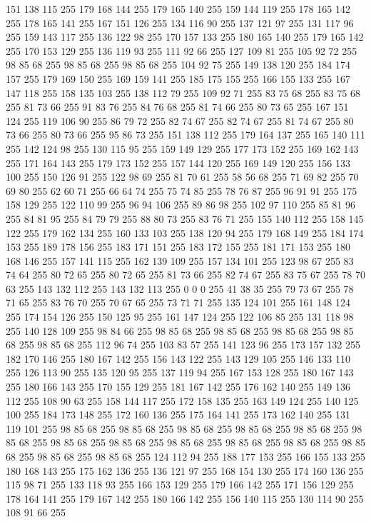151 138 115 255 179 168 144 255 179 165 140 255 159 144 119 255 178 165 142 255 178 165 141 255 167 151 126 255 134 116 90 255 137 121 97 255 131 117 96 255 159 143 117 255 136 122 98 255 170 157 133 255 180 165 140 255 179 165 142 255 170 153 129 255 136 119 93 255 111 92 66 255 127 109 81 255 105 92 72 255 98 85 68 255 98 85 68 255 98 85 68 255 104 92 75 255 149 138 120 255 184 174 157 255 179 169 150 255 169 159 141 255 185 175 155 255 166 155 133 255 167 147 118 255 158 135 103 255 138 112 79 255 109 92 71 255 83 75 68 255 83 75 68 255 81 73 66 255 91 83 76 255 84 76 68 255 81 74 66 255 80 73 65 255 167 151 124 255 119 106 90 255 86 79 72 255 82 74 67 255 82 74 67 255 81 74 67 255 80 73 66 255 80 73 66 255 95 86 73 255 151 138 112 255 179 164 137 255 165 140 111 255 142 124 98 255 130 115 95 255 159 149 129 255 177 173 152 255 169 162 143 255 171 164 143 255 179 173 152 255 157 144 120 255 169 149 120 255 156 133 100 255 150 126 91 255
122 98 69 255 81 70 61 255 58 56 68 255 71 69 82 255 70 69 80 255 62 60 71 255 66 64 74 255 75 74 85 255 78 76 87 255 96 91 91 255 175 158 129 255 122 110 99 255 96 94 106 255 89 86 98 255 102 97 110 255 85 81 96 255 84 81 95 255 84 79 79 255 88 80 73 255 83 76 71 255 155 140 112 255 158 145 122 255 179 162 134 255 160 133 103 255 138 120 94 255 179 168 149 255 184 174 153 255 189 178 156 255 183 171 151 255 183 172 155 255 181 171 153 255 180 168 146 255 157 141 115 255 162 139 109 255 157 134 101 255 123 98 67 255 83 74 64 255 80 72 65 255 80 72 65 255 81 73 66 255 82 74 67 255 83 75 67 255 78 70 63 255 143 132 112 255 143 132 113 255 0 0 0 255 41 38 35 255 79 73 67 255 78 71 65 255 83 76 70 255 70 67 65 255 73 71 71 255 135 124 101 255 161 148 124 255 174 154 126 255 150 125 95 255 161 147 124 255 122 106 85 255 131 118 98 255 140 128 109 255 98 84 66 255 98 85 68 255 98 85 68 255 98 85 68 255
98 85 68 255 98 85 68 255 112 96 74 255 103 83 57 255 141 123 96 255 173 157 132 255 182 170 146 255 180 167 142 255 156 143 122 255 143 129 105 255 146 133 110 255 126 113 90 255 135 120 95 255 137 119 94 255 167 153 128 255 180 167 143 255 180 166 143 255 170 155 129 255 181 167 142 255 176 162 140 255 149 136 112 255 108 90 63 255 158 144 117 255 172 158 135 255 163 149 124 255 140 125 100 255 184 173 148 255 172 160 136 255 175 164 141 255 173 162 140 255 131 119 101 255 98 85 68 255 98 85 68 255 98 85 68 255 98 85 68 255 98 85 68 255 98 85 68 255 98 85 68 255 98 85 68 255 98 85 68 255 98 85 68 255 98 85 68 255 98 85 68 255 98 85 68 255 98 85 68 255 124 112 94 255 188 177 153 255 166 155 133 255 180 168 143 255 175 162 136 255 136 121 97 255 168 154 130 255 174 160 136 255 115 98 71 255 133 118 93 255 166 153 129 255 179 166 142 255 171 156 129 255 178 164 141 255 179 167 142 255 180 166 142 255 156 140 115 255 130 114 90 255 108 91 66 255

